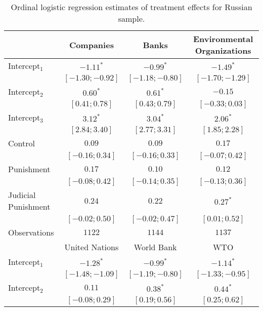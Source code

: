 \begin{table}[h]
\begin{center}
\caption{Ordinal logistic regression estimates of treatment effects for Russian sample.}
\begin{threeparttable}
\begin{tabular}{l c c c}
\hline
 & Companies & Banks & Environmental
Organizations \\
\hline
Intercept$_1$       & $-1.11^{*}$       & $-0.99^{*}$       & $-1.49^{*}$       \\
                    & $ [-1.30; -0.92]$ & $ [-1.18; -0.80]$ & $ [-1.70; -1.29]$ \\
Intercept$_2$       & $0.60^{*}$        & $0.61^{*}$        & $-0.15$           \\
                    & $ [ 0.41;  0.78]$ & $ [ 0.43;  0.79]$ & $ [-0.33;  0.03]$ \\
Intercept$_3$       & $3.12^{*}$        & $3.04^{*}$        & $2.06^{*}$        \\
                    & $ [ 2.84;  3.40]$ & $ [ 2.77;  3.31]$ & $ [ 1.85;  2.28]$ \\
Control             & $0.09$            & $0.09$            & $0.17$            \\
                    & $ [-0.16;  0.34]$ & $ [-0.16;  0.33]$ & $ [-0.07;  0.42]$ \\
Punishment          & $0.17$            & $0.10$            & $0.12$            \\
                    & $ [-0.08;  0.42]$ & $ [-0.14;  0.35]$ & $ [-0.13;  0.36]$ \\
Judicial Punishment & $0.24$            & $0.22$            & $0.27^{*}$        \\
                    & $ [-0.02;  0.50]$ & $ [-0.02;  0.47]$ & $ [ 0.01;  0.52]$ \\
\hline
Observations        & $1122$            & $1144$            & $1137$            \\
\hline
 & United Nations & World Bank & WTO \\
\hline
Intercept$_1$       & $-1.28^{*}$       & $-0.99^{*}$       & $-1.14^{*}$       \\
                    & $ [-1.48; -1.09]$ & $ [-1.19; -0.80]$ & $ [-1.33; -0.95]$ \\
Intercept$_2$       & $0.11$            & $0.38^{*}$        & $0.44^{*}$        \\
                    & $ [-0.08;  0.29]$ & $ [ 0.19;  0.56]$ & $ [ 0.25;  0.62]$ \\

\end{tabular}
\end{threeparttable}
\end{center}
\end{table}
